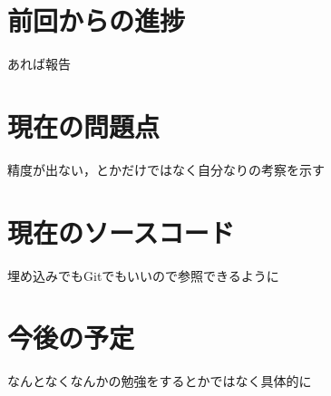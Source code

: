 \documentclass[twocolumn]{jarticle}     %
\begin{document}
\section{前回からの進捗}
あれば報告


\section{現在の問題点}
精度が出ない，とかだけではなく自分なりの考察を示す

\section{現在のソースコード}
埋め込みでもGitでもいいので参照できるように

\section{今後の予定}
なんとなくなんかの勉強をするとかではなく具体的に


	
	
\end{document}
